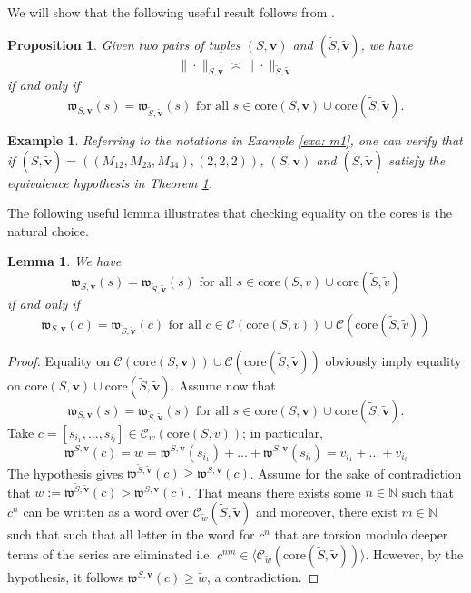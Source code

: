 \documentclass[pdflatex,sn-mathphys-num]{sn-jnl}%
\theoremstyle{thmstyleone}%
\newtheorem{pro}[theo]{Proposition}%
\theoremstyle{thmstyletwo}%
\newtheorem{exa}{Example}%
\theoremstyle{thmstylethree}%
\newtheorem{lem}{Lemma}%
\begin{document}
We will show that the following useful result follows from \cite{SCZ-nil}.
\begin{pro} \label{frakeq}Given two pairs of tuples $(S,\mathbf v)$ and $(\tilde{S},\tilde{\mathbf v})$, we have
$$\|\cdot\|_{S,\mathbf v}\asymp \|\cdot\|_{\tilde{S},\tilde{\mathbf v}
} $$  if and only if
$$\mathfrak w_{S,\mathbf v}(s)=\mathfrak w_{\tilde{S},\tilde{\mathbf v}}(s)
\mbox{ for all } s\in \mbox{core}(S,\mathbf{v}) \cup \mbox{core}(\tilde{S}, \tilde{\mathbf{v}}).$$
\end{pro}


\begin{exa}
\label{exa: m2}
    Referring to the notations in Example \ref{exa: m1}, one can verify that if $(\tilde{S}, \tilde{\mathbf{v}}) = ((M_{12}, M_{23}, M_{34}), (2,2,2))$, $(S,\mathbf{v})$ and $(\tilde{S}, \tilde{\mathbf{v}})$ satisfy the equivalence hypothesis in Theorem \ref{frakeq}.  
\end{exa}

The following useful lemma illustrates that checking equality on the cores is the natural choice. 
\begin{lem}
\label{lem: commutators_wt} We have 
$$\mathfrak w_{S,\mathbf v}(s)=\mathfrak w_{\tilde{S},\tilde{\mathbf v}}(s)
\mbox{ for all } s\in \mbox{core}(S,v) \cup \mbox{core}(\tilde{S}, \tilde{v})$$
if and only if 
$$\mathfrak w_{S,\mathbf v}(c)=\mathfrak w_{\tilde{S},\tilde{\mathbf v}}(c)
\mbox{ for all } c\in\mathcal{C}(\mbox{core}(S,v)) \cup \mathcal{C}(\mbox{core}(\tilde{S}, \tilde{v})) $$
\end{lem}
\begin{proof}
    Equality on $\mathcal{C}(\mbox{core}(S,\mathbf{v})) \cup \mathcal{C}(\mbox{core}(\tilde{S}, \tilde{\mathbf{v}}))$ obviously imply equality on $\mbox{core}(S,\mathbf{v}) \cup \mbox{core}(\tilde{S}, \tilde{\mathbf{v}})$.  Assume now that $$\mathfrak w_{S,\mathbf v}(s)=\mathfrak w_{\tilde{S},\tilde{\mathbf v}}(s)
\mbox{ for all } s\in \mbox{core}(S,\mathbf{v}) \cup \mbox{core}(\tilde{S}, \tilde{\mathbf{v}}).$$ Take
     $c = [s_{i_1}, \ldots, s_{i_l}] \in \mathcal{C}_{w}(\mbox{core}(S,v))$; in particular, $$\mathfrak{w}^{S,\mathbf v}(c) = w = 
     \mathfrak{w}^{S,\mathbf v}(s_{i_1})  + \ldots + \mathfrak{w}^{S,\mathbf v}(s_{i_l}) = v_{i_1} + \ldots + v_{i_l}  $$ The hypothesis gives
     $\mathfrak{w}^{\tilde{S},\tilde{\mathbf v}}(c) \ge \mathfrak{w}^{S,\mathbf v}(c) $. Assume for the sake of contradiction that $\tilde{w} := \mathfrak{w}^{\tilde{S},\tilde{\mathbf v}}(c) > \mathfrak{w}^{S,\mathbf v}(c) $. That means there exists some $n \in \mathbb{N}$ such that $c^n $ can be written as a word over 
$\mathcal{C}_{\tilde{w}}(\tilde{S}, \tilde{\mathbf{v}})$ and moreover, there exist $m \in \mathbb{N}$ such that such that all letter in the word for $c^n$ that are torsion modulo deeper terms of the series are eliminated  i.e. $c^{nm} \in \langle \mathcal{C}_{\tilde{w}}(\mbox{core}(\tilde{S}, \tilde{\mathbf{v}}) )\rangle$. However, by the hypothesis, it follows $\mathfrak{w}^{S,\mathbf v}(c) \ge \tilde{w}$, a contradiction. 
\end{proof}
\end{document}
